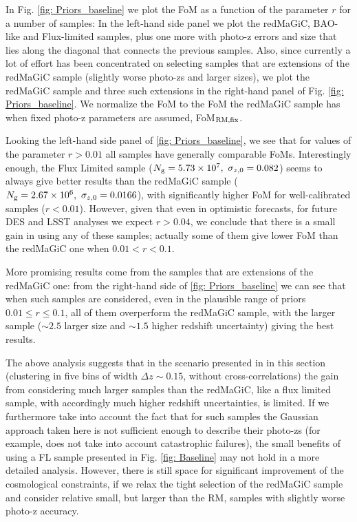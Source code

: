 \documentclass[a4paper,fleqn,usenatbib]{mnras}
\begin{document}
In Fig. \ref{fig: Priors_baseline} we plot the FoM as a function of the parameter $r$ for a number of samples: In the left-hand side panel we plot the redMaGiC, BAO-like and Flux-limited samples, plus one more with photo-z errors and size that lies along the diagonal that connects the previous samples. Also, since currently  a lot of effort has been concentrated on selecting samples that are extensions of the redMaGiC sample (slightly worse photo-zs and larger sizes), we plot the redMaGiC sample and three such extensions in the right-hand panel of Fig. \ref{fig: Priors_baseline}. We normalize the FoM to the FoM the redMaGiC sample has when fixed photo-z parameters are assumed, FoM$_{\mbox{\scriptsize{RM,fix}}}$.

Looking the left-hand side panel of \ref{fig: Priors_baseline},  we see that for values of the parameter $r > 0.01$ all samples have generally comparable FoMs. Interestingly enough, the Flux Limited sample ($N_{\mbox{\scriptsize{g}}} = 5.73 \times 10^7, \,\, \sigma_{z,0} = 0.082$) seems to always give better results than the redMaGiC sample ($N_{\mbox{\scriptsize{g}}} = 2.67 \times 10^6, \,\, \sigma_{z,0} = 0.0166$), with significantly higher FoM for well-calibrated samples ($r<0.01$). However, given that even in optimistic forecasts, for future DES and LSST analyses we expect $r > 0.04$, we conclude that there is a small gain in using any of these samples; actually some of them give lower FoM than the redMaGiC one when $0.01 < r < 0.1$.

More promising results come from the samples that are extensions of the redMaGiC one: from the right-hand side of \ref{fig: Priors_baseline} we can see that when such samples are considered, even in the plausible range of priors $0.01 \leq r \leq 0.1$, all of them overperform the redMaGiC sample, with the larger sample ($\sim 2.5$ larger size and $\sim 1.5$ higher redshift uncertainty) giving the best results.

The above analysis suggests that in the scenario presented in in this section (clustering in five bins of width $\Delta z \sim 0.15$, without cross-correlations) the gain from considering much larger samples than the redMaGiC, like a flux limited sample, with accordingly much higher redshift uncertainties, is limited. If we furthermore take into account the fact that for such samples the Gaussian approach taken here is not sufficient enough to describe their photo-zs (for example, does not take into account catastrophic failures), the small benefits of using a FL sample presented in Fig. \ref{fig: Baseline} may not hold in a more detailed analysis. However, there is still space for significant improvement of the cosmological constraints, if we relax the tight selection of the redMaGiC sample and consider relative small, but larger than the RM, samples with slightly worse photo-z accuracy. 
\end{document}
